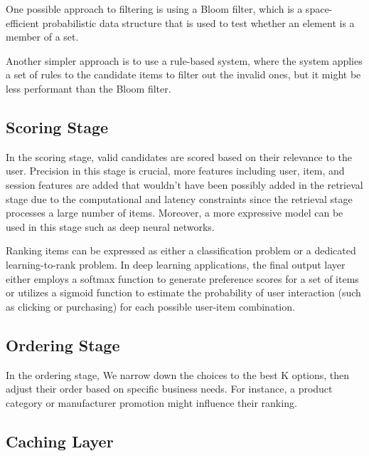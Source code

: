 One possible approach to filtering is using a Bloom filter, which is a space-efficient probabilistic data structure that is used to test whether an element is a member of a set.

Another simpler approach is to use a rule-based system, where the system applies a set of rules to the candidate items to filter out the invalid ones, but it might be less performant than the Bloom filter.


\subsection{Scoring Stage}

In the scoring stage, valid candidates are scored based on their relevance to the user. Precision in this stage is crucial, more features including user, item, and session features are added that wouldn't have been possibly added in the retrieval stage due to the computational and latency constraints since the retrieval stage processes a large number of items. Moreover, a more expressive model can be used in this stage such as deep neural networks. \cite{eugeneyan}

Ranking items can be expressed as either a classification problem or a dedicated learning-to-rank problem. In deep learning applications, the final output layer either employs a softmax function to generate preference scores for a set of items or utilizes a sigmoid function to estimate the probability of user interaction (such as clicking or purchasing) for each possible user-item combination. \cite{eugeneyan}

\subsection{Ordering Stage}
In the ordering stage, We narrow down the choices to the best K options, then adjust their order based on specific business needs. For instance, a product category or manufacturer promotion might influence their ranking. \cite{NvidiaRecSysBestPractices}

\subsection{Caching Layer}
